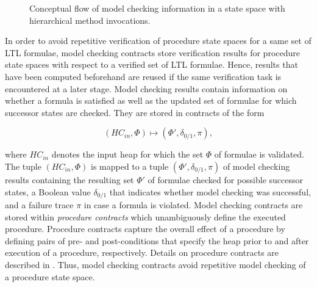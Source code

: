 \documentclass[a4paper, 12pt, twoside]{report}
\begin{document}
\begin{figure}
\begin{center}
{\begin{tikzpicture}
				\end{tikzpicture}}
			\caption{Conceptual flow of model checking information in a state space with hierarchical method invocations.}\label{fig:otf_hierarchy}
		\end{center}
	\end{figure}	

	In order to avoid repetitive verification of procedure state spaces for a same set of LTL formulae, model checking contracts store verification results for procedure state spaces with respect to a verified set of LTL formulae. Hence, results that have been computed beforehand are reused if the same verification task is encountered at a later stage. Model checking results contain information on whether a formula is satisfied as well as the updated set of formulae for which successor states are checked. They are stored in contracts of the form
	
	\[(HC_{in}, \Phi) \mapsto (\Phi', \delta_{0/1}, \pi),\]
	
	where $HC_{in}$ denotes the input heap for which the set $\Phi$ of formulae is validated. The tuple $(HC_{in}, \Phi)$ is mapped to a tuple $(\Phi', \delta_{0/1}, \pi)$ of model checking results containing the resulting set $\Phi'$ of formulae checked for possible successor states, a Boolean value $\delta_{0/1}$ that indicates whether model checking was successful, and a failure trace $\pi$ in case a formula is violated. Model checking contracts are stored within \textit{procedure contracts} which unambiguously define the executed procedure. Procedure contracts capture the overall effect of a procedure by defining pairs of pre- and post-conditions that specify the heap prior to and after execution of a procedure, respectively. Details on procedure contracts are described in \cite{jansen2014generating}. Thus, model checking contracts avoid repetitive model checking of a procedure state space.\\
	
\end{document}
